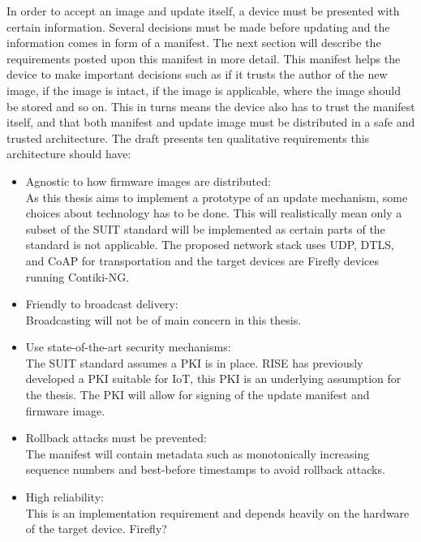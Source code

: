 \documentclass[0-thesis.tex]{subfiles}
\begin{document}
In order to accept an image and update itself, a device must be presented with certain
information. Several decisions must be made before updating and the information comes in
form of a manifest. The next section will describe the requirements posted upon this
manifest in more detail. This manifest helps the device to make important decisions such
as if it trusts the author of the new image, if the image is intact, if the image is
applicable, where the image should be stored and so on. This in turns means the device
also has to trust the manifest itself, and that both manifest and update image must be
distributed in a safe and trusted architecture. The draft \parencite{suit-architecture}
presents ten qualitative requirements this architecture should have:
\begin{itemize}
    \item Agnostic to how firmware images are distributed:\\
            As this thesis aims to implement a prototype of an update mechanism, some
            choices about technology has to be done. This will realistically mean only a
            subset of the SUIT standard will be implemented as certain parts of the
            standard is not applicable. The proposed network stack uses UDP, DTLS, and
            CoAP for transportation and the target devices are Firefly devices running
            Contiki-NG.
    \item Friendly to broadcast delivery:\\
            Broadcasting will not be of main concern in this thesis.
    \item Use state-of-the-art security mechanisms:\\
            The SUIT standard assumes a PKI is in place. RISE has previously developed a
            PKI suitable for IoT, this PKI is an underlying assumption for the thesis. The
            PKI will allow for signing of the update manifest and firmware image.
    \item Rollback attacks must be prevented:\\
            The manifest will contain metadata such as monotonically increasing sequence
            numbers and best-before timestamps to avoid rollback attacks.
    \item High reliability:\\
            This is an implementation requirement and depends heavily on the hardware of
            the target device. %
            Firefly?

\end{itemize}
\end{document}

